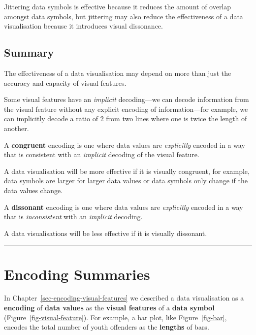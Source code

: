 \documentclass[
  letterpaper,
  DIV=11,
  numbers=noendperiod]{scrreprt}
\begin{document}
Jittering data symbols is effective because it reduces the amount of
overlap amongst data symbols, but jittering may also reduce the
effectiveness of a data visualisation because it introduces visual
dissonance.

\section{Summary}\label{summary-6}

The effectiveness of a data visualisation may depend on more than just
the accuracy and capacity of visual features.

Some visual features have an \emph{implicit} decoding---we can decode
information from the visual feature without any explicit encoding of
information---for example, we can implicitly decode a ratio of 2 from
two lines where one is twice the length of another.

A \textbf{congruent} encoding is one where data values are
\emph{explicitly} encoded in a way that is consistent with an
\emph{implicit} decoding of the visual feature.

A data visualisation will be more effective if it is visually congruent,
for example, data symbols are larger for larger data values or data
symbols only change if the data values change.

A \textbf{dissonant} encoding is one where data values are
\emph{explicitly} encoded in a way that is \emph{inconsistent} with an
\emph{implicit} decoding.

A data visualisations will be less effective if it is visually
dissonant.

\begin{center}\rule{0.5\linewidth}{0.5pt}\end{center}

\theendnotes


\chapter{Encoding Summaries}\label{sec-summaries}

In Chapter~\ref{sec-encoding-visual-features} we described a data
visualisation as a \textbf{encoding} of \textbf{data values} as the
\textbf{visual features} of a \textbf{data symbol}
(Figure~\ref{fig-visual-feature}). For example, a bar plot, like
Figure~\ref{fig-bar}, encodes the total number of youth offenders as the
\textbf{lengths} of bars.
\end{document}
